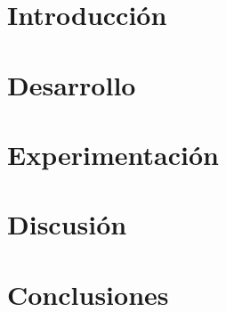 \documentclass[11pt,a4paper]{tesis}
\begin{document}
\def\titulo{Licenciado }
\def\autor{Mariano Bianchi}
\def\tituloTesis{Seguimiento de Objetos en Secuencias de Imágenes RGB-D}
\def\runtitulo{Seguimiento de Objetos en Secuencias de Imágenes RGB-D}
\def\runtitle{Object tracking using RGB-D image sequences}
\def\director{Francisco Roberto Gómez Fernández}
\def\lugar{Buenos Aires, 2014}


\frontmatter
\pagestyle{empty}


\cleardoublepage


\cleardoublepage


\cleardoublepage
\tableofcontents

\mainmatter
\pagestyle{headings}


\chapter{Introducción}

\chapter{Desarrollo}
\chapter{Experimentación}
\chapter{Discusión}
\chapter{Conclusiones}


\backmatter


\end{document}
